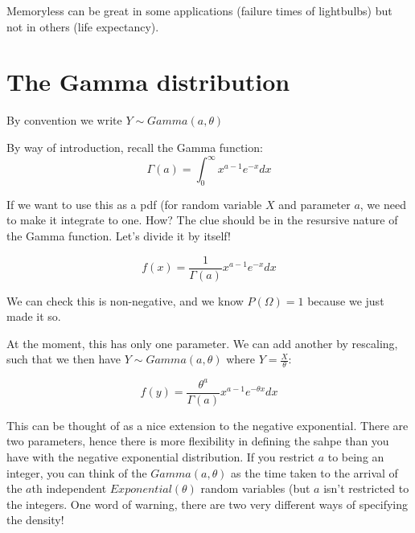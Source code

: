 \documentclass[12pt]{extbook}
\begin{document}



Memoryless can be great in some applications (failure times of lightbulbs) but not in others (life expectancy).




\section{The Gamma distribution}

{\color{green} By convention we write $Y \sim Gamma(a,\theta)$}

By way of introduction, recall the Gamma function:
\begin{displaymath}
\Gamma (a) = \int_0^{\infty} x^{a-1} e^{-x} dx
\end{displaymath}

If we want to use this as a pdf (for random variable $X$ and parameter $a$, we need to make it integrate to one.   How?   The clue should be in the resursive nature of the Gamma function.   Let's divide it by itself!

\begin{displaymath}
f(x) = \frac{1}{\Gamma (a)} x^{a-1} e^{-x} dx
\end{displaymath}

We can check this is non-negative, and we know $P(\Omega)=1$ because we just made it so.




At the moment, this has only one parameter.   We can add another by rescaling, such that we then have $Y \sim Gamma(a,\theta)$ where $Y = \frac{X}{\theta}$:

\begin{displaymath}
f(y) = \frac{\theta^a}{\Gamma (a)} x^{a-1} e^{-\theta x} dx
\end{displaymath}

This can be thought of as a nice extension to the negative exponential.  There are two parameters, hence there is more flexibility in defining the sahpe than you have with the negative exponential distribution.   If you restrict $a$ to being an integer, you can think of the $Gamma(a, \theta)$ as the time taken to the arrival of the $a$th independent $Exponential(\theta)$ random variables (but $a$ isn't restricted to the integers.   One word of warning, there are two very different ways of specifying the density!  %
\end{document}
